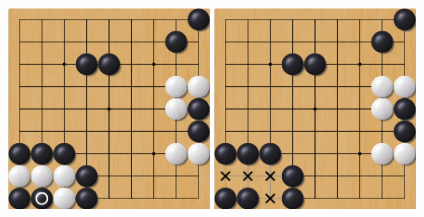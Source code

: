 \documentclass[compress, color = usenames, dvipsnames]{beamer}
\begin{document}
{\begin{center}
       { \includegraphics[width=0.4\textwidth]{figs/gorule_capture5.png} }%
       { \includegraphics[width=0.4\textwidth]{figs/gorule_capture6.png} }
  \end{center}

}
\end{document}
